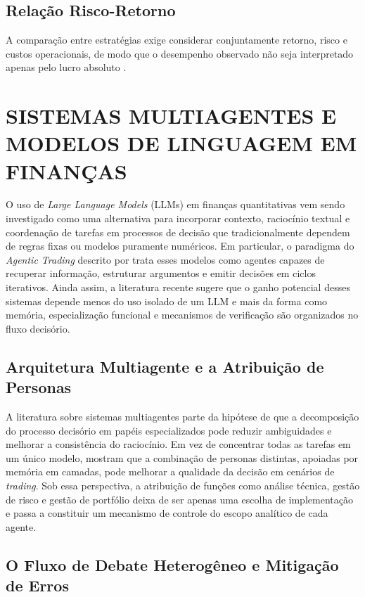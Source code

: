 \documentclass{eic-bcc-tcc}
\begin{document}
\subsection{Relação Risco-Retorno}
A comparação entre estratégias exige considerar conjuntamente retorno, risco e custos operacionais, de modo que o desempenho observado não seja interpretado apenas pelo lucro absoluto \citep{LopezDePrado2018}.

\section{SISTEMAS MULTIAGENTES E MODELOS DE LINGUAGEM EM FINANÇAS}

O uso de \textit{Large Language Models} (LLMs) em finanças quantitativas vem sendo investigado como uma alternativa para incorporar contexto, raciocínio textual e coordenação de tarefas em processos de decisão que tradicionalmente dependem de regras fixas ou modelos puramente numéricos. Em particular, o paradigma do \textit{Agentic Trading} descrito por \citet[p. 1]{Xia2026} trata esses modelos como agentes capazes de recuperar informação, estruturar argumentos e emitir decisões em ciclos iterativos. Ainda assim, a literatura recente sugere que o ganho potencial desses sistemas depende menos do uso isolado de um LLM e mais da forma como memória, especialização funcional e mecanismos de verificação são organizados no fluxo decisório.

\subsection{Arquitetura Multiagente e a Atribuição de Personas}

A literatura sobre sistemas multiagentes parte da hipótese de que a decomposição do processo decisório em papéis especializados pode reduzir ambiguidades e melhorar a consistência do raciocínio. Em vez de concentrar todas as tarefas em um único modelo, \citet[p. 1]{Li2023} mostram que a combinação de personas distintas, apoiadas por memória em camadas, pode melhorar a qualidade da decisão em cenários de \textit{trading}. Sob essa perspectiva, a atribuição de funções como análise técnica, gestão de risco e gestão de portfólio deixa de ser apenas uma escolha de implementação e passa a constituir um mecanismo de controle do escopo analítico de cada agente.

\subsection{O Fluxo de Debate Heterogêneo e Mitigação de Erros}
\end{document}
